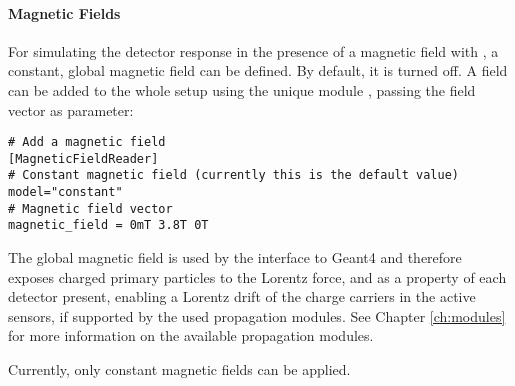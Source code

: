 \begin{itemize}
\paragraph{Magnetic Fields}
\label{sec:module_magnetic_field}

For simulating the detector response in the presence of a magnetic field with \apsq, a constant, global magnetic field can be defined. By default, it is turned off. A field can be added to the whole setup using the unique module , passing the field vector as parameter:
\begin{verbatim}
# Add a magnetic field
[MagneticFieldReader]
# Constant magnetic field (currently this is the default value)
model="constant"
# Magnetic field vector
magnetic_field = 0mT 3.8T 0T
\end{verbatim}

The global magnetic field is used by the interface to Geant4 and therefore exposes charged primary particles to the Lorentz force, and as a property of each detector present, enabling a Lorentz drift of the charge carriers in the active sensors, if supported by the used propagation modules. See Chapter \ref{ch:modules} for more information on the available propagation modules.

Currently, only constant magnetic fields can be applied.


\end{itemize}

